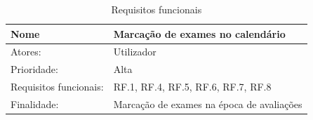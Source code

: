 \documentclass[11pt, twoside]{report}
\begin{document}
	
	\def\arraystretch{1.5}
	\begin{center}
		\label{usecasemarcarexame}
		\begin{longtable}{|m{4cm}|m{12cm}|}
			\caption{Requisitos funcionais}\\
			
			\hline
			\textbf{Nome }              & \textbf{Marcação de exames no calendário}                                                                                                                                                                                                                                                                                                                                                                                                \\
			\hline
			Atores:                     & Utilizador                                                                                                                                                                                                                                                                                                                                                                                                                                  \\
			\hline
			Prioridade:                 & Alta                                                                                                                                                                                                                                                                                                                                                                                                                                        \\
			\hline
			Requisitos funcionais:      & RF.1, RF.4, RF.5, RF.6, RF.7, RF.8                                                                                                                                                                                                                                                                                                                                                                                                          \\
			\hline
			Finalidade:                 & Marcação de exames na época de avaliações                                                                                                                                                                                                                                                                                                                                                                                              \\

\end{longtable}
\end{center}
\end{document}
